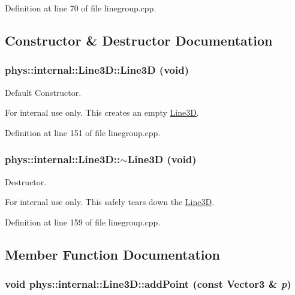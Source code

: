 Definition at line 70 of file linegroup.cpp.



\subsection{Constructor \& Destructor Documentation}
\hypertarget{classphys_1_1internal_1_1Line3D_ab22b8f5fae0bb2585b1031adfff424bd}{
\subsubsection[{Line3D}]{\setlength{\rightskip}{0pt plus 5cm}phys::internal::Line3D::Line3D (void)}}
\label{d4/db5/classphys_1_1internal_1_1Line3D_ab22b8f5fae0bb2585b1031adfff424bd}


Default Constructor. 

\begin{DoxyInternal}{For internal use only.}
This creates an empty \hyperlink{classphys_1_1internal_1_1Line3D}{Line3D}. \end{DoxyInternal}


Definition at line 151 of file linegroup.cpp.

\hypertarget{classphys_1_1internal_1_1Line3D_acddc95dd5f319d6afc68260af8bea39c}{
\subsubsection[{$\sim$Line3D}]{\setlength{\rightskip}{0pt plus 5cm}phys::internal::Line3D::$\sim$Line3D (void)}}
\label{d4/db5/classphys_1_1internal_1_1Line3D_acddc95dd5f319d6afc68260af8bea39c}


Destructor. 

\begin{DoxyInternal}{For internal use only.}
This safely tears down the \hyperlink{classphys_1_1internal_1_1Line3D}{Line3D}. \end{DoxyInternal}


Definition at line 159 of file linegroup.cpp.



\subsection{Member Function Documentation}
\hypertarget{classphys_1_1internal_1_1Line3D_aeb3b828b35b4c8ed76158285be6ddc67}{
\subsubsection[{addPoint}]{\setlength{\rightskip}{0pt plus 5cm}void phys::internal::Line3D::addPoint (const Vector3 \& {\em p})}}
\label{d4/db5/classphys_1_1internal_1_1Line3D_aeb3b828b35b4c8ed76158285be6ddc67}


